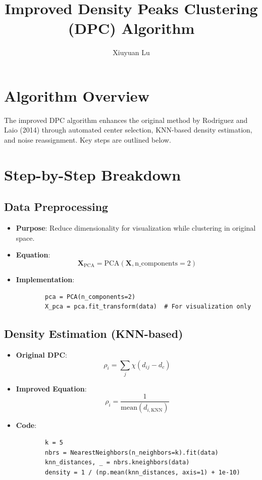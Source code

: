\documentclass{article}
\title{Improved Density Peaks Clustering (DPC) Algorithm}
\author{Xiuyuan Lu}
\begin{document}
\maketitle

\section{Algorithm Overview}
The improved DPC algorithm enhances the original method by Rodriguez and Laio (2014) through automated center selection, KNN-based density estimation, and noise reassignment. Key steps are outlined below.

\section{Step-by-Step Breakdown}

\subsection{Data Preprocessing}
\begin{itemize}
    \item \textbf{Purpose}: Reduce dimensionality for visualization while clustering in original space.
    \item \textbf{Equation}: 
    \begin{equation}
        \mathbf{X}_{\text{PCA}} = \text{PCA}(\mathbf{X}, \text{n\_components}=2)
    \end{equation}
    \item \textbf{Implementation}: 
    \begin{verbatim}
        pca = PCA(n_components=2)
        X_pca = pca.fit_transform(data)  # For visualization only
    \end{verbatim}
\end{itemize}

\subsection{Density Estimation (KNN-based)}
\begin{itemize}
    \item \textbf{Original DPC}: 
    \begin{equation}
        \rho_i = \sum_j \chi(d_{ij} - d_c)
    \end{equation}
    \item \textbf{Improved Equation}: 
    \begin{equation}
        \rho_i = \frac{1}{\text{mean}(d_{i,\text{KNN}})}
    \end{equation}
    \item \textbf{Code}:
    \begin{verbatim}
        k = 5
        nbrs = NearestNeighbors(n_neighbors=k).fit(data)
        knn_distances, _ = nbrs.kneighbors(data)
        density = 1 / (np.mean(knn_distances, axis=1) + 1e-10)
    \end{verbatim}
\end{itemize}
\end{document}
